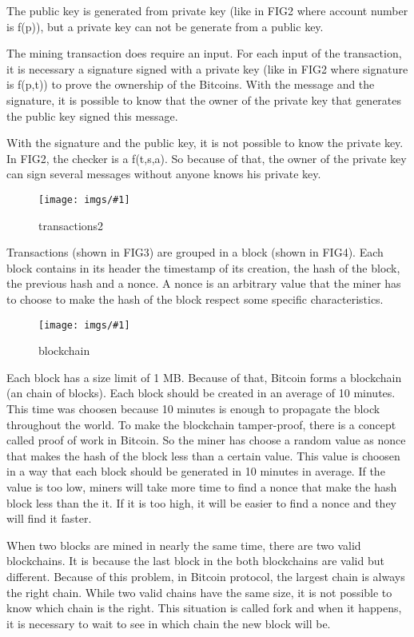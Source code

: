 \documentclass[12pt]{article}
\newcommand{\incgraph}[2]{\texttt{[image: imgs/\#1]}}
\newcommand{\incimgdiv}[3]{
  \begin{figure}
    \incgraph{#1.#2}{#3}
    \caption{#1}
    \label{fig:#1}
  \end{figure}
}
\newcommand{\incimg}[2]{\incimgdiv{#1}{#2}{1}}
\begin{document}
The public key is generated from private key (like in FIG2 where account number is f(p)), 
but a private key can not be generate from a public key.

The mining transaction does require an input.
For each input of the transaction, it is necessary a signature signed with a private key
(like in FIG2 where signature is f(p,t))
to prove the ownership of the Bitcoins.
With the message and the signature, it is possible to know that the owner of the private key
that generates the public key signed this message.

With the signature and the public key, it is not possible to know the private key.
In FIG2, the checker is a f(t,s,a).
So because of that, the owner of the private key can sign several messages without anyone knows
his private key.

\incimg{transactions2}{jpg}

Transactions (shown in FIG3) are grouped in a block (shown in FIG4).
Each block contains in its header the timestamp of its creation, the hash of the block,
the previous hash and a nonce.
A nonce is an arbitrary value that the miner has to choose to make the hash of the block respect some
specific characteristics.

\incimg{blockchain}{png}

Each block has a size limit of 1 MB.
Because of that, Bitcoin forms a blockchain (an chain of blocks).
Each block should be created in an average of 10 minutes.
This time was choosen because 10 minutes is enough to propagate the block throughout the world.
To make the blockchain tamper-proof, there is a concept called proof of work in Bitcoin.
So the miner has choose a random value as nonce that makes the hash of the block less
than a certain value.
This value is choosen in a way that each block should be generated in 10 minutes in average.
If the value is too low, miners will take more time to find a nonce that make the hash block
less than the it.
If it is too high, it will be easier to find a nonce and they will find it faster.

When two blocks are mined in nearly the same time, there are two valid blockchains.
It is because the last block in the both blockchains are valid but different.
Because of this problem, in Bitcoin protocol, the largest chain is always the right chain.
While two valid chains have the same size, it is not possible to know which chain is the right.
This situation is called fork and when it happens, it is necessary to wait to see in which chain
the new block will be.
\end{document}
